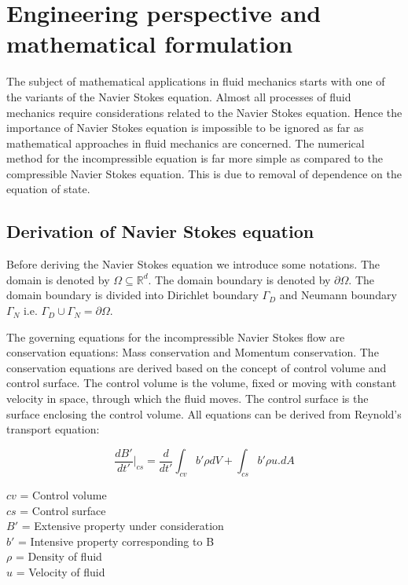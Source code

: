 \documentclass[a4paper,12pt]{book}
\begin{document}
\chapter{Engineering perspective and mathematical formulation} 

The subject of mathematical applications in fluid mechanics starts with  one of the variants of the Navier Stokes equation. Almost all processes of fluid mechanics require considerations related to the Navier Stokes equation. Hence the importance of Navier Stokes equation is impossible to be ignored as far as mathematical approaches in fluid mechanics are concerned. The numerical method for the incompressible equation is far more simple as compared to the compressible Navier Stokes equation. This is due to removal of dependence on the equation of state. 

\section{Derivation of Navier Stokes equation}\cite{white}

Before deriving the Navier Stokes equation we introduce some notations. The domain is denoted by $\Omega \subseteq \mathbb{R}^d $. The domain boundary is denoted by $\partial \Omega$. The domain boundary is divided into Dirichlet boundary $\Gamma_D$ and Neumann boundary $\Gamma_N$ i.e. $\Gamma_D \cup \Gamma_N = \partial \Omega $. 

The governing equations for the incompressible Navier Stokes flow are conservation equations: Mass conservation and Momentum conservation. The conservation equations are derived based on the concept of control volume and control surface. The control volume is the volume, fixed or moving with constant velocity in space, through which the fluid moves. The control surface is the surface enclosing the control volume. All equations can be derived from Reynold's transport equation:\cite{white}


\begin{equation} \label{rtt} 
\frac{dB'}{dt'}|_{cs} = \frac{d}{dt'} \int_{cv} b' \rho dV + \int_{cs} b' \rho u.dA 
\end{equation}

\begin{center}
$cv$ = Control volume\\
$cs$ = Control surface\\
$B'$ = Extensive property under consideration  \\
$b'$ = Intensive property corresponding to B \\
$\rho$ = Density of fluid \\
$u$ = Velocity of fluid\\
\end{center}
\end{document}
